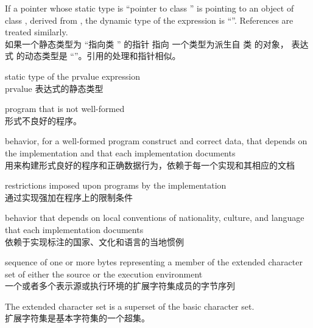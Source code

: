 \begin{example}
If a pointer  whose static type is ``pointer to
class '' is pointing to an object of class , derived
from , the dynamic type of the
expression  is ``''. References are
treated similarly. \\
如果一个静态类型为 ``指向类 '' 的指针  指向
一个类型为派生自  类  的对象，
表达式  的动态类型是 ``''。引用的处理和指针相似。
\end{example}

%
 static type of the prvalue expression \\
prvalue 表达式的静态类型

%
program that is not well-formed \\
形式不良好的程序。

%
behavior, for a well-formed program construct and correct data, that
depends on the implementation and that each implementation documents \\
用来构建形式良好的程序和正确数据行为，依赖于每一个实现和其相应的文档


%
restrictions imposed upon programs by the implementation \\
通过实现强加在程序上的限制条件

%
behavior that depends on local conventions of nationality, culture, and
language that each implementation documents \\
依赖于实现标注的国家、文化和语言的当地惯例

%
sequence of one or more bytes representing a member of the extended
character set of either the source or the execution environment \\
一个或者多个表示源或执行环境的扩展字符集成员的字节序列

\begin{defnote}
The extended character set is a superset of the basic character
set. \\
扩展字符集是基本字符集的一个超集。
\end{defnote}

